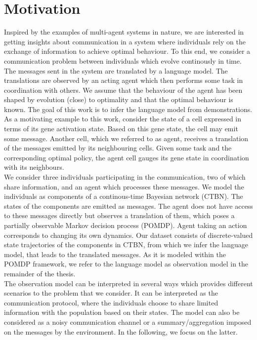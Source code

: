 \section{Motivation}
Inspired by the examples of multi-agent systems in nature, we are interested in getting insights about communication in a system where individuals rely on the exchange of information to achieve optimal behaviour. To this end, we consider a communication problem between individuals which evolve continously in time. The messages sent in the system are translated by a language model. The translations are observed by an acting agent which then performs some task in coordination with others. We assume that the behaviour of the agent has been shaped by evolution (close) to optimality and that the optimal behaviour is known. The goal of this work is to infer the language model from demonstrations. \\
As a motivating example to this work, consider the state of a cell expressed in terms of its gene activation state. Based on this gene state, the cell may emit some message. Another cell, which we referred to as agent, receives a translation of the messages emitted by its neighbouring cells. Given some task and the corresponding optimal policy, the agent cell gauges its gene state in coordination with its neighbours.\\
We consider three individuals participating in the communication, two of which share information, and an agent which processes these messages. We model the individuals as components of a continous-time Bayesian network (CTBN). The states of the components are emitted as messages. The agent does not have access to these messages directly but observes a translation of them, which poses a partially observable Markov decision process (POMDP). Agent taking an action corresponds to changing its own dynamics. Our dataset consists of discrete-valued state trajectories of the components in CTBN, from which we infer the language model, that leads to the translated messages. As it is modeled within the POMDP framework, we refer to the language model as observation model in the remainder of the thesis.\\
The observation model can be interpreted in several ways which provides different scenarios to the problem that we consider. It can be interpreted as the communication protocol, where the individuals choose to share limited information with the population based on their states. The model can also be considered as a noisy communication channel or a summary/aggregation imposed on the messages by the environment. In the following, we focus on the latter.
\pagebreak
